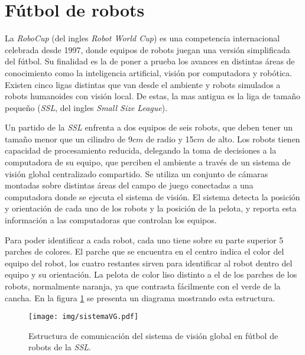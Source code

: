 
\section{Fútbol de robots}

La \emph{RoboCup}\cite{robocupHist} (del ingles \emph{Robot World Cup}) es una
competencia internacional celebrada desde 1997, donde equipos de robots juegan
una versión simplificada del fútbol. Su finalidad es la de poner a prueba los
avances en distintas áreas de conocimiento como la inteligencia artificial,
visión por computadora y robótica. Existen cinco ligas distintas que van desde
el ambiente y robots simulados a robots humanoides con visión local. De estas,
la mas antigua es la liga de tamaño pequeño (\emph{SSL}, del ingles \emph{Small
Size League}).

Un partido de la \emph{SSL} enfrenta a dos equipos de seis robots, que deben
tener un tamaño menor que un cilindro de 9$cm$ de radio y 15$cm$ de
alto\cite{sslrules2015}. Los robots tienen capacidad de procesamiento reducida,
delegando la toma de decisiones a la computadora de su equipo, que perciben el
ambiente a través de un sistema de visión global centralizado compartido. Se
utiliza un conjunto de cámaras montadas sobre distintas áreas del campo de juego
conectadas a una computadora donde se ejecuta el sistema de visión. El sistema
detecta la posición y orientación de cada uno de los robots y la posición de la
pelota, y reporta esta información a las computadoras que controlan los equipos.

Para poder identificar a cada robot, cada uno tiene sobre su parte superior 5
parches de colores. El parche que se encuentra en el centro indica el color del
equipo del robot, los cuatro restantes sirven para identificar al robot dentro
del equipo y su orientación. La pelota de color liso distinto a el de los
parches de los robots, normalmente naranja, ya que contrasta fácilmente con el
verde de la cancha. En la figura \ref{sistemaVG} se presenta un diagrama
mostrando esta estructura.

\begin{figure}[!h]

	\texttt{[image: img/sistemaVG.pdf]}
	\caption{Estructura de comunicación del sistema de visión global en
	fútbol de robots de la \emph{SSL}.}
	\label{sistemaVG}

\end{figure}

